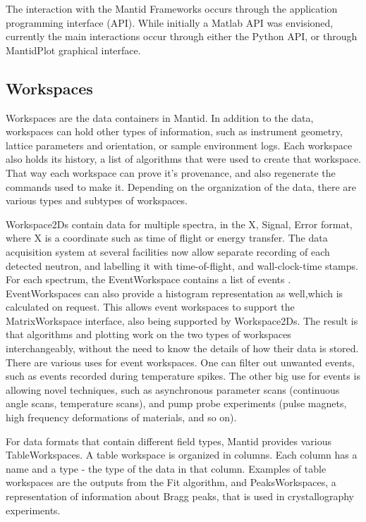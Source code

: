 \documentclass{elsarticle}
\begin{document}
The interaction with the Mantid Frameworks occurs through the application programming interface (API). While initially a Matlab API was envisioned, currently the main interactions occur through either the Python API, or through MantidPlot graphical interface. 


\subsection{Workspaces}
Workspaces are the data containers in Mantid. In addition to the data, workspaces can hold other types of information, such as instrument geometry, lattice parameters and orientation, or sample environment logs. Each workspace also holds its history, a list of algorithms that were used to create that workspace. That way each workspace can prove it's provenance, and also regenerate the commands used to make it. Depending on the organization of the data, there are various types and subtypes of workspaces.

Workspace2Ds contain data for multiple spectra, in the X, Signal, Error format, where X is a coordinate such as time of flight or energy transfer. The data acquisition system at several facilities now allow separate recording of each  detected neutron, and labelling it with time-of-flight, and wall-clock-time stamps. For each spectrum, the EventWorkspace contains a list of events \cite{EventPaper}. EventWorkspaces can also provide a histogram representation as well,which is calculated on request. This allows event workspaces to support the MatrixWorkspace interface, also being supported by Workspace2Ds. The result is that algorithms and plotting work on the two types of workspaces interchangeably, without the need to know the details of how their data is stored. 
There are various uses for event workspaces. One can filter out unwanted events, such as events recorded during temperature spikes. The other big use for events is allowing novel techniques, such as asynchronous parameter scans (continuous angle scans, temperature scans), and pump probe experiments (pulse magnets, high frequency deformations of materials, and so on).

For data formats that contain different field types, Mantid provides various TableWorkspaces. A table workspace is organized in columns. Each column has a name and a type - the type of the data in that column. Examples of table workspaces are the outputs from the Fit algorithm, and PeaksWorkspaces, a representation of information about Bragg peaks, that is used in crystallography experiments.
 
\end{document}
